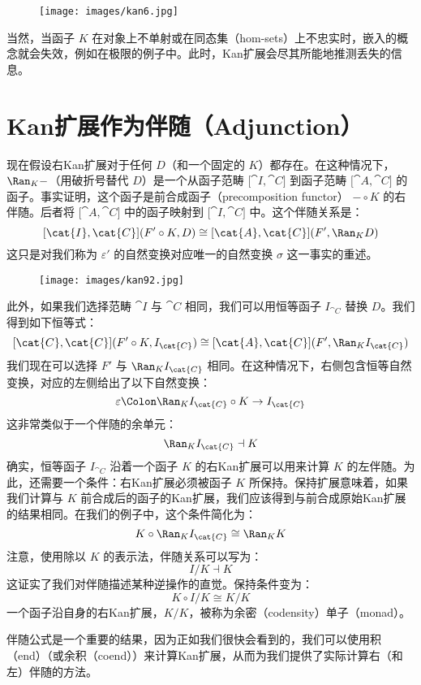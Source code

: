 \begin{figure}[H]
  \centering
  \texttt{[image: images/kan6.jpg]}
\end{figure}

\noindent
当然，当函子 $K$ 在对象上不单射或在同态集（hom-sets）上不忠实时，嵌入的概念就会失效，例如在极限的例子中。此时，Kan扩展会尽其所能地推测丢失的信息。

\section{Kan扩展作为伴随（Adjunction）}

现在假设右Kan扩展对于任何 $D$（和一个固定的 $K$）都存在。在这种情况下，$\Ran_{K}-$（用破折号替代 $D$）是一个从函子范畴 ${[}\cat{I}, \cat{C}{]}$ 到函子范畴 ${[}\cat{A}, \cat{C}{]}$ 的函子。事实证明，这个函子是前合成函子（precomposition functor） $- \circ K$ 的右伴随。后者将 ${[}\cat{A}, \cat{C}{]}$ 中的函子映射到 ${[}\cat{I}, \cat{C}{]}$ 中。这个伴随关系是：
\[[\cat{I}, \cat{C}](F' \circ K, D) \cong [\cat{A}, \cat{C}](F', \Ran_{K}D)\]
这只是对我们称为 $\varepsilon'$ 的自然变换对应唯一的自然变换 $\sigma$ 这一事实的重述。

\begin{figure}[H]
  \centering
  \texttt{[image: images/kan92.jpg]}
\end{figure}

\noindent
此外，如果我们选择范畴 $\cat{I}$ 与 $\cat{C}$ 相同，我们可以用恒等函子 $I_{\cat{C}}$ 替换 $D$。我们得到如下恒等式：
\[[\cat{C}, \cat{C}](F' \circ K, I_{\cat{C}}) \cong [\cat{A}, \cat{C}](F', \Ran_{K}I_{\cat{C}})\]
我们现在可以选择 $F'$ 与 $\Ran_{K}I_{\cat{C}}$ 相同。在这种情况下，右侧包含恒等自然变换，对应的左侧给出了以下自然变换：
\[\varepsilon \Colon \Ran_{K}I_{\cat{C}} \circ K \to I_{\cat{C}}\]
这非常类似于一个伴随的余单元：
\[\Ran_{K}I_{\cat{C}} \dashv K\]
确实，恒等函子 $I_{\cat{C}}$ 沿着一个函子 $K$ 的右Kan扩展可以用来计算 $K$ 的左伴随。为此，还需要一个条件：右Kan扩展必须被函子 $K$ 所保持。保持扩展意味着，如果我们计算与 $K$ 前合成后的函子的Kan扩展，我们应该得到与前合成原始Kan扩展的结果相同。在我们的例子中，这个条件简化为：
\[K \circ \Ran_{K}I_{\cat{C}} \cong \Ran_{K}K\]
注意，使用除以 $K$ 的表示法，伴随关系可以写为：
\[I/K \dashv K\]
这证实了我们对伴随描述某种逆操作的直觉。保持条件变为：
\[K \circ I/K \cong K/K\]
一个函子沿自身的右Kan扩展，$K/K$，被称为余密（codensity）单子（monad）。

伴随公式是一个重要的结果，因为正如我们很快会看到的，我们可以使用积（end）（或余积（coend））来计算Kan扩展，从而为我们提供了实际计算右（和左）伴随的方法。

